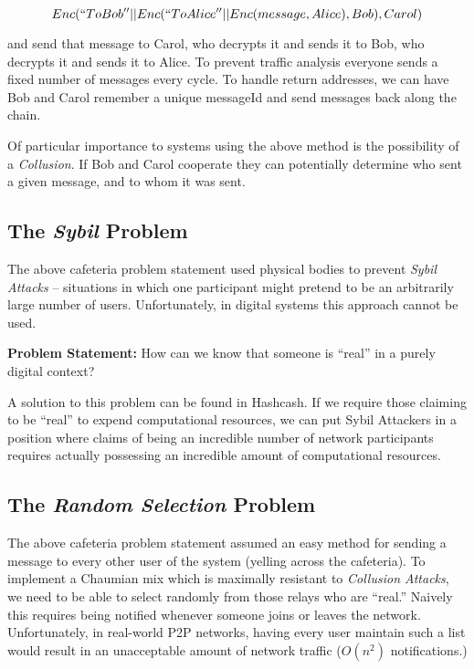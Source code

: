 $$Enc(``To Bob'' || Enc(``To Alice'' || Enc(message, Alice), Bob), Carol)$$

and send that message to Carol, who decrypts it and sends it to Bob,
who decrypts it and sends it to Alice. To prevent traffic analysis
everyone sends a fixed number of messages every cycle.  To handle
return addresses, we can have Bob and Carol remember a unique
messageId and send messages back along the chain.

Of particular importance to systems using the above method is the
possibility of a \emph{Collusion}. If Bob and Carol cooperate they can
potentially determine who sent a given message, and to whom it was
sent.

\subsection{The \emph{Sybil} Problem}

The above cafeteria problem statement used physical bodies to
prevent \emph{Sybil Attacks} -- situations in which one participant
might pretend to be an arbitrarily large number of
users. Unfortunately, in digital systems this approach cannot be used.

\textbf{Problem Statement:} How can we know that someone is ``real''
in a purely digital context?

A solution to this problem can be found in Hashcash\cite{CHORD}. If we
require those claiming to be ``real'' to expend computational
resources, we can put Sybil Attackers in a position where claims of
being an incredible number of network participants requires actually
possessing an incredible amount of computational resources.

\subsection{The \emph{Random Selection} Problem}

The above cafeteria problem statement assumed an easy method for
sending a message to every other user of the system (yelling across
the cafeteria). To implement a Chaumian mix which is maximally
resistant to \emph{Collusion Attacks}, we need to be able to select
randomly from those relays who are ``real.'' Naively this requires
being notified whenever someone joins or leaves the network.
Unfortunately, in real-world P2P networks, having every user maintain
such a list would result in an unacceptable amount of network traffic
($O(n^2)$ notifications.)

